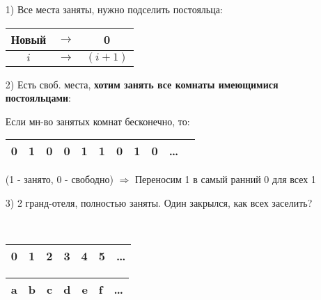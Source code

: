 \begin{itemize}
  \item [1) ] Все места заняты, нужно подселить постояльца:
    \begin{solution}
      \begin{center}
      \begin{tabular}{ |c|c|c| } 
       \hline
       Новый & $\rightarrow$ & 0 \\
       \hline
       $i$ & $\rightarrow$ & $\left(i + 1\right)$ \\
       \hline
      \end{tabular}
      \end{center}
    \end{solution}
  \item [2) ] Есть своб. места, \textbf{хотим занять все комнаты имеющимися постояльцами}:
    \begin{solution}
    Если мн-во занятых комнат бесконечно, то:
    \begin{center}
    \begin{tabular}{ |c|c|c|c|c|c|c|c|c|c|c } 
     \hline
     0 & 1 & 0 & 0 & 1 & 1 & 0 & 1 & 0 & \ldots \\ 
     \hline
    \end{tabular}
    (1 - занято, 0 - свободно) $\Rightarrow$ Переносим 1 в самый ранний 0 для всех 1
\begin{comment}
    (Как делать стрелки между ячейками таблиц)???
\end{comment}
    \end{center}
    \end{solution}
  \item [3) ] 2 гранд-отеля, полностью заняты. Один закрылся, как всех заселить?
    \begin{solution}
  ~\newline
    \begin{center}
    \begin{tabular}{ |c|c|c|c|c|c|c| } 
     \hline
     0 & 1 & 2 & 3 & 4 & 5 & \ldots \\ 
     \hline
    \end{tabular}
    \end{center}
    \begin{center}
    \begin{tabular}{ |c|c|c|c|c|c|c| } 
     \hline
     a & b & c & d & e & f & \ldots \\ 
     \hline
    \end{tabular}
    \end{center}

\end{solution}
\end{itemize}
